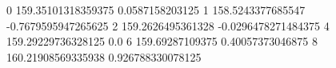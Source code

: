 0 159.35101318359375 0.0587158203125
1 158.5243377685547 -0.7679595947265625
2 159.2626495361328 -0.0296478271484375
4 159.29229736328125 0.0
6 159.69287109375 0.40057373046875
8 160.21908569335938 0.926788330078125
